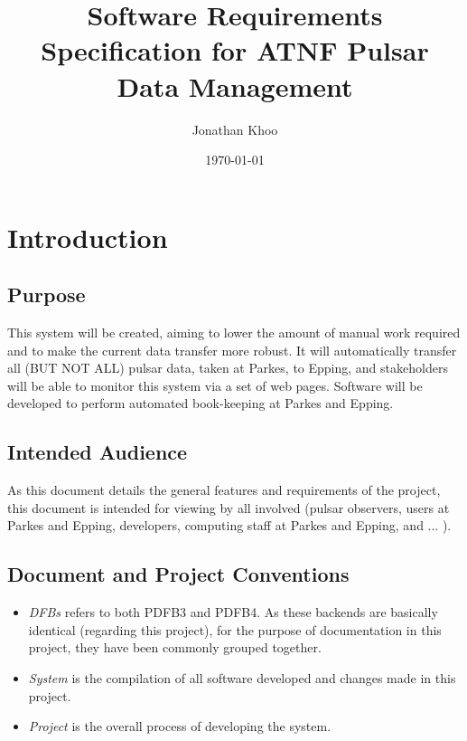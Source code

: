 \documentclass[a4paper,11pt]{article}
\begin{document}
\title{Software Requirements Specification for ATNF Pulsar Data Management}
\author{Jonathan Khoo}
\date{\today}
\maketitle
\clearpage

\section{Introduction}


\subsection{Purpose}
This system will be created, aiming to lower the amount of manual work required and to make the current data transfer more robust. It will automatically transfer all (BUT NOT ALL) pulsar data, taken at Parkes, to Epping, and stakeholders will be able to monitor this system via a set of web pages. Software will be developed to perform automated book-keeping at Parkes and Epping.

\subsection{Intended Audience}
As this document details the general features and requirements of the project, this document is intended for viewing by all involved (pulsar observers, users at Parkes and Epping, developers, computing staff at Parkes and Epping, and ... ).

\subsection{Document and Project Conventions}
\begin{itemize}
\item \emph{DFBs} refers to both PDFB3 and PDFB4. As these backends are basically identical (regarding this project), for the purpose of documentation in this project, they have been commonly grouped together.
\item \emph{System} is the compilation of all software developed and changes made in this project.
\item \emph{Project} is the overall process of developing the system.
\end{itemize}
\end{document}
